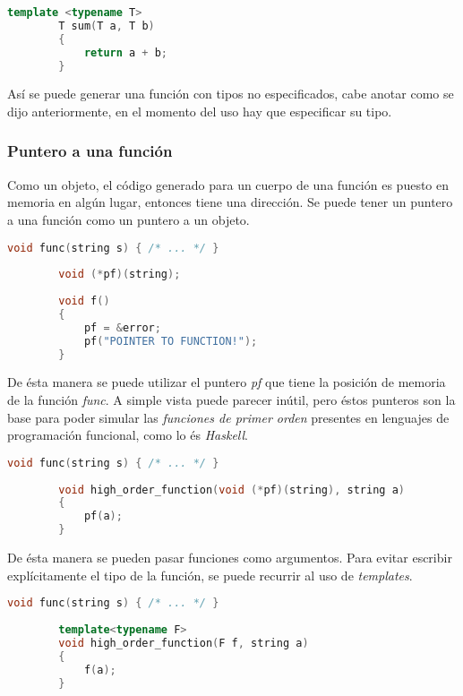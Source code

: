		\begin{lstlisting}[language=C++, caption=Función que suma dos variables de tipo T]
		template <typename T>
		T sum(T a, T b)
		{
			return a + b;
		}
		\end{lstlisting}
		
		Así se puede generar una función con tipos no especificados, cabe anotar como se dijo anteriormente, en el momento del uso hay que especificar su tipo.
	
	\subsubsection{Puntero a una función}
		Como un objeto, el código generado para un cuerpo de una función es puesto en memoria en algún lugar, entonces tiene una dirección. Se puede tener un puntero a una función como un puntero a un objeto. \cite{Bjarne2013}
		
		\begin{lstlisting}[language=C++, caption=Puntero a una función]
		void func(string s) { /* ... */ }
		
		void (*pf)(string);
		
		void f()
		{
			pf = &error;
			pf("POINTER TO FUNCTION!");
		}
		\end{lstlisting}
		
		De ésta manera se puede utilizar el puntero \emph{pf} que tiene la posición de memoria de la función \emph{func}. A simple vista puede parecer inútil, pero éstos punteros son la base para poder simular las \emph{funciones de primer orden} presentes en lenguajes de programación funcional, como lo és \emph{Haskell}.
		
		\begin{lstlisting}[language=C++, caption=Funciones de primer orden]
		void func(string s) { /* ... */ }
		
		void high_order_function(void (*pf)(string), string a)
		{
			pf(a);
		}
		\end{lstlisting}
		
		De ésta manera se pueden pasar funciones como argumentos. Para evitar escribir explícitamente el tipo de la función, se puede recurrir al uso de \emph{templates}.
		
		\begin{lstlisting}[language=C++, caption=Funciones de primer orden con templates]
		void func(string s) { /* ... */ }
		
		template<typename F>
		void high_order_function(F f, string a)
		{ 
			f(a);
		}
		\end{lstlisting}
		
